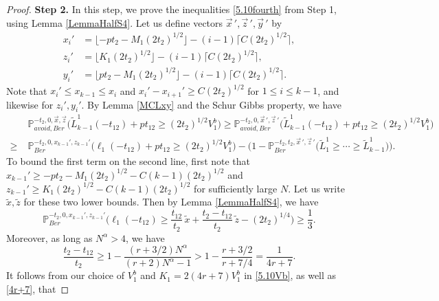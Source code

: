 \begin{proof}
	\noindent\textbf{Step 2.} In this step, we prove the inequalities \eqref{5.10fourth} from Step 1, using Lemma \ref{LemmaHalfS4}. Let us define vectors $\vec{x}\,', \vec{z}\,', \vec{y}\,'$ by
	\begin{align*}
	x_i' &= \lfloor -pt_2 - M_1(2t_2)^{1/2}\rfloor - (i-1)\lceil C(2t_2)^{1/2}\rceil,\\
	z_i' &= \lfloor K_1(2t_2)^{1/2}\rfloor - (i-1)\lceil C(2t_2)^{1/2}\rceil,\\
	y_i' &= \lfloor pt_2 - M_1(2t_2)^{1/2}\rfloor - (i-1)\lceil C(2t_2)^{1/2}\rceil.
	\end{align*}
	Note that $x_i' \leq x_{k-1} \leq x_i$ and $x_i' - x_{i+1}' \geq C(2t_2)^{1/2}$ for $1\leq i\leq k - 1$, and likewise for $z_i',y_i'$. By Lemma \ref{MCLxy} and the Schur Gibbs property, we have
	\begin{equation}\label{5.10separate}
	\begin{split}
	&\mathbb{P}^{-t_2,0,\vec{x},\vec{z}}_{avoid,Ber}\Big(\tilde{L}^1_{k-1}(-t_{12}) + pt_{12} \geq (2t_2)^{1/2}V_1^b\Big) \geq \mathbb{P}^{-t_2,0,\vec{x}\,',\vec{z}\,'}_{avoid,Ber}\Big(\tilde{L}^1_{k-1}(-t_{12}) + pt_{12} \geq (2t_2)^{1/2}V_1^b\Big)\\ \geq \; & \mathbb{P}^{-t_2,0,x_{k-1}',z_{k-1}'}_{Ber}\Big(\ell_1(-t_{12}) + pt_{12} \geq (2t_2)^{1/2}V_1^b\Big) - \big( 1 - \mathbb{P}^{-t_2,t_2,\vec{x}\,',\vec{z}\,'}_{Ber}\big(\tilde{L}^1_1 \geq \cdots \geq \tilde{L}_{k-1}^1\big)\big).
	\end{split}
	\end{equation} 
	To bound the first term on the second line, first note that $x_{k-1}' \geq -pt_2 - M_1(2t_2)^{1/2} - C(k-1)(2t_2)^{1/2}$ and $z_{k-1}' \geq K_1(2t_2)^{1/2} - C(k-1)(2t_2)^{1/2}$ for sufficiently large $N$. Let us write $\tilde{x},\tilde{z}$ for these two lower bounds. Then by Lemma \ref{LemmaHalfS4}, we have
	\begin{equation}\label{5.10third1}
	\mathbb{P}^{-t_2,0,x_{k-1}',z_{k-1}'}_{Ber}\Big(\ell_1(-t_{12}) \geq \frac{t_{12}}{t_2}\,\tilde{x} + \frac{t_2-t_{12}}{t_2}\,\tilde{z} - (2t_2)^{1/4}\Big) \geq \frac{1}{3}.
	\end{equation}  
	Moreover, as long as $N^\alpha > 4$, we have 
	\begin{equation}\label{4r+7}
	\frac{t_2-t_{12}}{t_2} \geq 1 - \frac{(r+3/2)N^\alpha}{(r+2)N^\alpha - 1} > 1-\frac{r+3/2}{r+7/4} = \frac{1}{4r+7}.
	\end{equation}
	It follows from our choice of $V_1^b$ and $K_1 = 2(4r+7)V_1^b$ in \eqref{5.10Vb}, as well as \eqref{4r+7}, that 

\end{proof}

